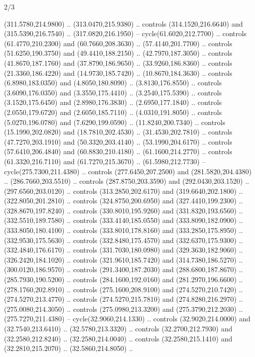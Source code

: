 \begin{flagdescription}{2/3}
\begin{scope}[xshift=0.5\flaglength,yshift=0.5\flagwidth,scale=\stretchfactor]
\begin{scope}[scale=0.001645\flagwidth,yshift=65mm,xshift=-63mm]
\begin{scope}[y=0.80pt, x=0.80pt, yscale=-1,]
\begin{scope}[cm={{1.33333,0.0,0.0,1.33333,(0.0,1e-05)}}]
  (311.5780,214.9800) .. (313.0470,215.9380) .. controls (314.1520,216.6640) and
  (315.5390,216.7540) .. (317.0820,216.1950) -- cycle(61.6020,212.7700) ..
  controls (61.4770,210.2300) and (60.7660,208.3630) .. (57.4140,201.7700) ..
  controls (51.6250,190.3750) and (49.4410,188.2150) .. (42.7970,187.3050) ..
  controls (41.8670,187.1760) and (37.8790,186.9650) .. (33.9260,186.8360) ..
  controls (21.3360,186.4220) and (14.9730,185.7420) .. (10.8670,184.3630) ..
  controls (6.8980,183.0350) and (4.8050,180.8090) .. (3.8130,176.8550) ..
  controls (3.6090,176.0350) and (3.3550,175.4410) .. (3.2540,175.5390) ..
  controls (3.1520,175.6450) and (2.8980,176.3830) .. (2.6950,177.1840) ..
  controls (2.0550,179.6720) and (2.6050,185.7110) .. (4.0310,191.8050) ..
  controls (5.0270,196.0780) and (7.6290,199.0590) .. (11.8240,200.7340) ..
  controls (15.1990,202.0820) and (18.7810,202.4530) .. (31.4530,202.7810) ..
  controls (47.7270,203.1910) and (50.3320,203.4140) .. (53.1990,204.6170) ..
  controls (57.6410,206.4840) and (60.8830,210.4180) .. (61.1600,214.2770) ..
  controls (61.3320,216.7110) and (61.7270,215.3670) .. (61.5980,212.7730) --
  cycle(275.7300,211.4380) .. controls (277.6450,207.2500) and
  (281.5820,204.4380) .. (286.7660,203.5510) .. controls (287.8750,203.3590) and
  (292.0430,203.1520) .. (297.6560,203.0120) .. controls (313.2850,202.6170) and
  (319.6640,202.1800) .. (322.8050,201.2810) .. controls (324.8750,200.6950) and
  (327.4410,199.2300) .. (328.8670,197.8240) .. controls (330.8010,195.9260) and
  (331.8320,193.6560) .. (332.5510,189.7580) .. controls (333.4140,185.0550) and
  (333.8090,182.0900) .. (333.8050,180.4100) .. controls (333.8010,178.8160) and
  (333.2850,175.8950) .. (332.9530,175.5630) .. controls (332.8480,175.4570) and
  (332.6370,175.9300) .. (332.4840,176.6170) .. controls (331.7030,180.0980) and
  (329.3630,182.9060) .. (326.2420,184.1020) .. controls (321.9610,185.7420) and
  (314.7380,186.5270) .. (300.0120,186.9570) .. controls (291.3400,187.2030) and
  (288.6800,187.8670) .. (285.7930,190.5200) .. controls (284.1600,192.0160) and
  (281.2970,196.6600) .. (278.1760,202.8910) .. controls (275.1600,208.9100) and
  (274.5270,210.7420) .. (274.5270,213.4770) .. controls (274.5270,215.7810) and
  (274.8280,216.2970) .. (275.0080,214.3050) .. controls (275.0980,213.3200) and
  (275.3790,212.2030) .. (275.7270,211.4380) -- cycle(32.9060,214.1330) ..
  controls (32.9020,214.0000) and (32.7540,213.6410) .. (32.5780,213.3320) ..
  controls (32.2700,212.7930) and (32.2580,212.8240) .. (32.2580,214.0040) ..
  controls (32.2580,215.1410) and (32.2810,215.2070) .. (32.5860,214.8050) ..

\end{scope}
\end{scope}
\end{scope}
\end{scope}
\end{flagdescription}
